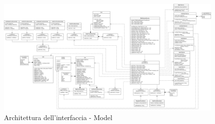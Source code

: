 \begin{landscape}
	\begin{figure}[h!]
		\includegraphics[width=25.5cm]{img/ui_messaggi.png}
		\caption{Architettura dell'interfaccia - Model}
	\end{figure}
\end{landscape}